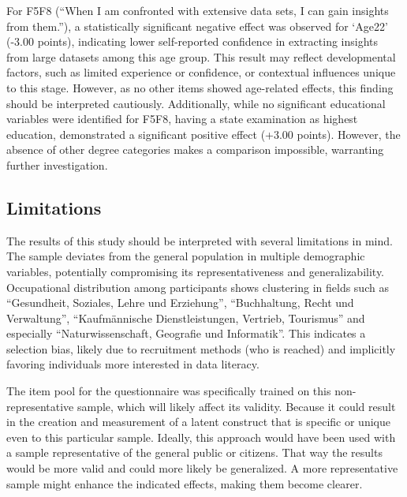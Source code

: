 \documentclass[
  12pt,
  a4paper,
  twoside]{article}
\begin{document}
For F5F8 (``When I am confronted with extensive data sets, I can gain insights from them.''), a statistically significant negative effect was observed for `Age22' (-3.00 points), indicating lower self-reported confidence in extracting insights from large datasets among this age group. This result may reflect developmental factors, such as limited experience or confidence, or contextual influences unique to this stage. However, as no other items showed age-related effects, this finding should be interpreted cautiously. Additionally, while no significant educational variables were identified for F5F8, having a state examination as highest education, demonstrated a significant positive effect (+3.00 points). However, the absence of other degree categories makes a comparison impossible, warranting further investigation.

\subsection{Limitations}\label{limitations}

The results of this study should be interpreted with several limitations in mind. The sample deviates from the general population in multiple demographic variables, potentially compromising its representativeness and generalizability. Occupational distribution among participants shows clustering in fields such as ``Gesundheit, Soziales, Lehre und Erziehung'', ``Buchhaltung, Recht und Verwaltung'', ``Kaufmännische Dienstleistungen, Vertrieb, Tourismus'' and especially ``Naturwissenschaft, Geografie und Informatik''. This indicates a selection bias, likely due to recruitment methods (who is reached) and implicitly favoring individuals more interested in data literacy.

The item pool for the questionnaire was specifically trained on this non-representative sample, which will likely affect its validity.
Because it could result in the creation and measurement of a latent construct that is specific or unique even to this particular sample.
Ideally, this approach would have been used with a sample representative of the general public or citizens.
That way the results would be more valid and could more likely be generalized.
A more representative sample might enhance the indicated effects, making them become clearer.
\end{document}
